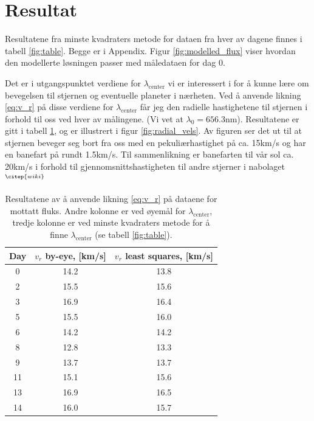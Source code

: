 \documentclass[reprint, english,notitlepage]{revtex4-1}  %
\begin{document}
\section{Resultat}

Resultatene fra minste
 kvadraters metode for dataen fra hver av dagene finnes i tabell \ref{fig:table}. Begge er i
 Appendix. Figur \ref{fig:modelled_flux} viser hvordan den modellerte løsningen passer med
 måledataen for dag 0.

Det er i utgangspunktet verdiene for $\lambda_{\text{center}}$ vi er interessert i for å kunne lære om
 bevegelsen til stjernen og eventuelle planeter i nærheten. Ved å anvende likning \ref{eq:v_r} på
 disse verdiene for $\lambda_{\text{center}}$ får jeg den radielle hastighetene til stjernen i forhold
 til oss ved hver av målingene. (Vi vet at $\lambda_0 = 656.3$nm). Resultatene er gitt i tabell
 \ref{fig:table_vels}, og er illustrert i figur \ref{fig:radial_vels}. Av figuren ser det ut til
 at stjernen beveger seg bort fra oss med en pekuliærhastighet på ca. 15km/s og har en banefart
 på rundt 1.5km/s. Til sammenlikning er banefarten til vår sol ca. 20km/s i forhold til
 gjennomsnittshastigheten til andre stjerner i nabolaget$^{\citep{wiki}}$

\begin{table}
\begin{adjustbox}{width=\linewidth}
\begin{tabular}{||c | c | c||}
\hline
Day & $v_r$ by-eye, [km/s] & $v_r$ least squares, [km/s] \\ \hline\hline
0 & 14.2 & 13.8    \\ \hline
2 & 15.5 & 15.6    \\ \hline
3 & 16.9 & 16.4    \\ \hline
5 & 15.5 & 16.0    \\ \hline
6 & 14.2 & 14.2    \\ \hline
8 & 12.8 & 13.3    \\ \hline
9 & 13.7 & 13.7    \\ \hline
11 & 15.1 & 15.6    \\ \hline
13 & 16.9 & 16.5    \\ \hline
14 & 16.0 & 15.7    \\ \hline
\end{tabular}
\end{adjustbox}
\caption{Resultatene av å anvende likning \ref{eq:v_r} på dataene for mottatt fluks. Andre kolonne er ved øyemål for $\lambda_{\text{center}}$, tredje kolonne er ved minste kvadraters metode for å finne $\lambda_{\text{center}}$ (se tabell \ref{fig:table}).}
\label{fig:table_vels}
\end{table}
\end{document}
